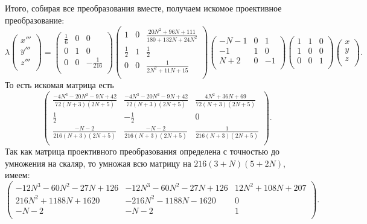 Итого, собирая все преобразования вместе, получаем искомое проективное
преобразование:
\[
    \lambda \begin{pmatrix}
        x''' \\
        y''' \\
        z''' \\
    \end{pmatrix} = 
    \begin{pmatrix}
        \frac{1}{6} & 0 & 0 \\
        0 & 1 & 0 \\
        0 & 0 & -\frac{1}{216} \\
    \end{pmatrix}
    \begin{pmatrix}
        1 & 0 & \frac{20 N^2 + 96 N + 111}{180 + 132 N + 24 N^2} \\
        \frac{1}{2} & 1 & \frac{1}{2} \\
        0 & 0 & \frac{1}{2 N^2 + 11 N + 15} \\
    \end{pmatrix}
    \begin{pmatrix}
        -N - 1 & 0 & 1 \\
        -1 & 1 & 0 \\
        N + 2 & 0 & -1 \\
    \end{pmatrix}
    \begin{pmatrix}
        1 & 1 & 0 \\
        1 & 0 & 0 \\
        0 & 0 & 1 \\
    \end{pmatrix}
    \begin{pmatrix}
        x \\
        y \\
        z \\
    \end{pmatrix}
.\] 
То есть искомая матрица есть
\[
\begin{pmatrix}
    \frac{-4 N^3 - 20 N^2 - 9 N + 42}{72 (N + 3) (2 N + 5)} &
    \frac{-4 N^3 - 20 N^2 - 9 N + 42}{72 (N + 3) (2 N + 5)} &
    \frac{4 N^2 + 36 N + 69}{72 (N + 3) (2 N + 5)} \\
    \frac{1}{2} &  -\frac{1}{2} & 0 \\
    \frac{-N - 2}{216 (N + 3) (2 N + 5)} & \frac{-N - 2}{216
    (N + 3) (2 N + 5)} & \frac{1}{216 (N + 3) (2 N + 5)} \\
\end{pmatrix}
.\] 
Так как матрица проективного преобразования определена с точностью до
умножения на скаляр, то умножая всю матрицу на \(216 (3 + N) (5 + 2 N)\),
имеем:
\[
\begin{pmatrix}
    -12 N^3 - 60 N^2 - 27 N + 126 &  -12 N^3 - 60 N^2 - 27 N + 126 &
    12 N^2 + 108 N + 207 \\
    216 N^2 + 1188 N + 1620 &  -216 N^2 - 1188 N - 1620 & 0 \\
    -N - 2 &  -N - 2 & 1 \\
\end{pmatrix}
.\] 

